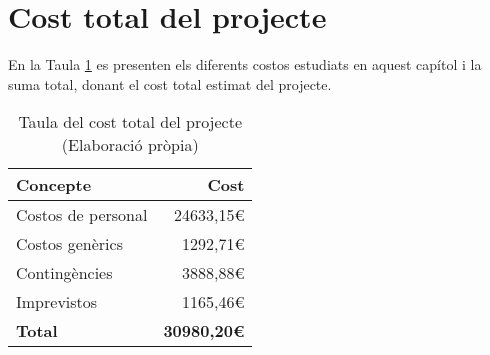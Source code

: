 \section{Cost total del projecte}
En la Taula \ref{tab:cost_total} es presenten els diferents costos estudiats en aquest capítol i la suma total, donant el cost total estimat del projecte.

\begin{table}[H]
    \centering
    \begin{tabular}{l|r}
         \textbf{Concepte} & \textbf{Cost} \\
    \hline
         Costos de personal  &  24633,15\euro \\
         Costos genèrics     &  1292,71\euro \\
         Contingències       &  3888,88\euro \\
         Imprevistos         &  1165,46\euro \\
     \hline
         \textbf{Total} & \textbf{30980,20\euro} \\
    \end{tabular}
    \caption[Cost total del projecte]{Taula del cost total del projecte \\ (Elaboració pròpia)}
    \label{tab:cost_total}
\end{table}
